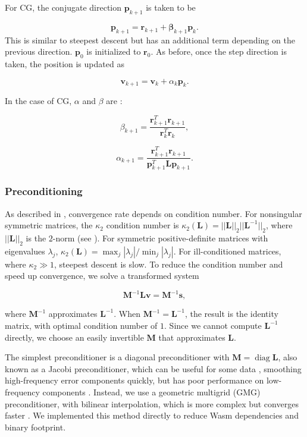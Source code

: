 \documentclass[11pt, a4paper]{article}
\DeclareMathOperator{\diag}{diag}
\begin{document}
For CG, the conjugate direction $\mathbf{p}_{k+1}$ is taken to be

\[
\mathbf{p}_{k+1} = \mathbf{r}_{k+1} + \mathbf{\beta}_{k+1}\mathbf{p}_k.
\]
This is similar to steepest descent but has an additional term depending on the previous direction.
$\mathbf{p}_{0}$ is initialized to $\mathbf{r}_0$.
As before, once the step direction is taken, the position is updated as

\[
\mathbf{v}_{k+1} = \mathbf{v}_k + \alpha_{k}\mathbf{p}_{k}.
\]

In the case of CG, $\alpha$ and $\beta$ are \cite[Ch. 4.3]{leveque2007finite}:

\[
\beta_{k+1} = \frac{\mathbf{r}^T_{k+1}\mathbf{r}_{k+1}}{\mathbf{r}_{k}^T\mathbf{r}_{k}},
\]

\[
\alpha_{k+1} = \frac{\mathbf{r}^T_{k+1}\mathbf{r}_{k+1}}{\mathbf{p}^T_{k+1}\mathbf{L}\mathbf{p}_{k+1}}.
\]


\subsubsection{Preconditioning} 

As described in \cite[Ch. 4.3.4]{leveque2007finite}, convergence rate depends on condition number. For nonsingular symmetric matrices,
the $\kappa_2$ condition number is $\kappa_2(\mathbf{L}) = ||\mathbf{L}||_2||\mathbf{L}^{-1}||_2$,
where $||\mathbf{L}||_2$ is the $2$-norm (see \cite[Ch A.3.2]{leveque2007finite}). 
For symmetric positive-definite matrices with eigenvalues $\lambda_j$, $\kappa_2(\mathbf{L}) = \max_j |\lambda_j| / \min_j |\lambda_j|$.
For ill-conditioned matrices, where $\kappa_2 \gg 1$, steepest descent is slow.
To reduce the condition number and speed up convergence, we solve a transformed system

\[
\mathbf{M}^{-1}\mathbf{L}\mathbf{v} = \mathbf{M}^{-1}\mathbf{s},
\] 

where $\mathbf{M}^{-1}$ approximates $\mathbf{L}^{-1}$. When $\mathbf{M}^{-1} = \mathbf{L}^{-1}$, the result is the identity matrix, with optimal condition number of $1$.
Since we cannot compute $\mathbf{L}^{-1}$ directly, we choose an easily invertible $\mathbf{M}$ that approximates $\mathbf{L}$.

The simplest preconditioner is a diagonal preconditioner with $\mathbf{M} = \diag{\mathbf{L}}$, also known as a Jacobi preconditioner, 
which can be useful for some data \cite{wathen2015preconditioning}, 
smoothing high-frequency error components quickly, but has poor performance on low-frequency components \cite[Ch. 4.6]{leveque2007finite}.
Instead, we use a geometric multigrid (GMG) preconditioner,
with bilinear interpolation,
which is more complex but converges faster \cite{tatebe1993multigrid}.
We implemented this method directly to reduce Wasm dependencies and binary footprint. 
\end{document}
